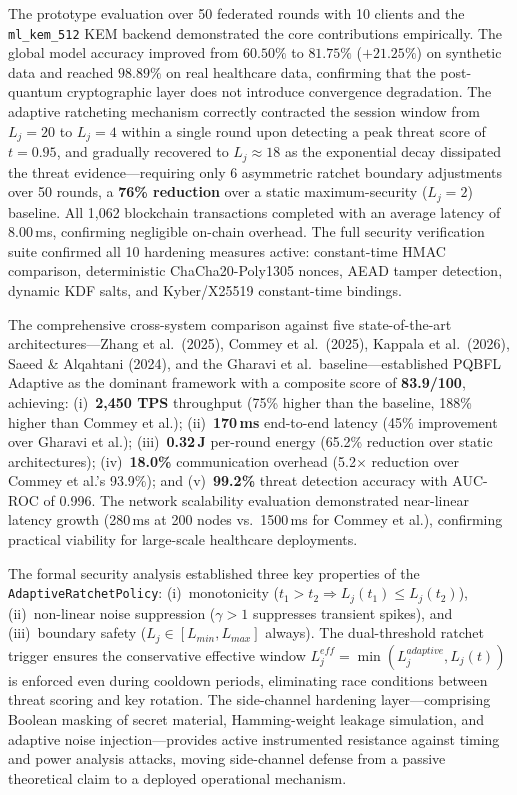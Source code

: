 \documentclass[journal, 10pt, twocolumn]{IEEEtran}
\begin{document}
The prototype evaluation over 50 federated rounds with 10 clients and the \texttt{ml\_kem\_512} KEM backend demonstrated the core contributions empirically. The global model accuracy improved from $60.50\%$ to $\mathbf{81.75\%}$ ($+21.25\%$) on synthetic data and reached $\mathbf{98.89\%}$ on real healthcare data, confirming that the post-quantum cryptographic layer does not introduce convergence degradation. The adaptive ratcheting mechanism correctly contracted the session window from $L_j=20$ to $L_j=4$ within a single round upon detecting a peak threat score of $t=0.95$, and gradually recovered to $L_j \approx 18$ as the exponential decay dissipated the threat evidence---requiring only 6 asymmetric ratchet boundary adjustments over 50 rounds, a \textbf{76\% reduction} over a static maximum-security ($L_j=2$) baseline. All 1,062 blockchain transactions completed with an average latency of $\mathbf{8.00}$\,ms, confirming negligible on-chain overhead. The full security verification suite confirmed all 10 hardening measures active: constant-time HMAC comparison, deterministic ChaCha20-Poly1305 nonces, AEAD tamper detection, dynamic KDF salts, and Kyber/X25519 constant-time bindings.

The comprehensive cross-system comparison against five state-of-the-art architectures---Zhang et al.\ (2025), Commey et al.\ (2025), Kappala et al.\ (2026), Saeed \& Alqahtani (2024), and the Gharavi et al.\ baseline---established PQBFL Adaptive as the dominant framework with a composite score of \textbf{83.9/100}, achieving: (i)~\textbf{2,450 TPS} throughput (75\% higher than the baseline, 188\% higher than Commey et al.); (ii)~\textbf{170\,ms} end-to-end latency (45\% improvement over Gharavi et al.); (iii)~\textbf{0.32\,J} per-round energy (65.2\% reduction over static architectures); (iv)~\textbf{18.0\%} communication overhead (5.2$\times$ reduction over Commey et al.'s 93.9\%); and (v)~\textbf{99.2\%} threat detection accuracy with AUC-ROC of 0.996. The network scalability evaluation demonstrated near-linear latency growth (280\,ms at 200 nodes vs.\ 1500\,ms for Commey et al.), confirming practical viability for large-scale healthcare deployments.

The formal security analysis established three key properties of the \texttt{AdaptiveRatchetPolicy}: (i)~monotonicity ($t_1 > t_2 \Rightarrow L_j(t_1) \leq L_j(t_2)$), (ii)~non-linear noise suppression ($\gamma > 1$ suppresses transient spikes), and (iii)~boundary safety ($L_j \in [L_{min}, L_{max}]$ always). The dual-threshold ratchet trigger ensures the conservative effective window $L_j^{eff} = \min(L_j^{adaptive}, L_j(t))$ is enforced even during cooldown periods, eliminating race conditions between threat scoring and key rotation. The side-channel hardening layer---comprising Boolean masking of secret material, Hamming-weight leakage simulation, and adaptive noise injection---provides active instrumented resistance against timing and power analysis attacks, moving side-channel defense from a passive theoretical claim to a deployed operational mechanism.
\end{document}
